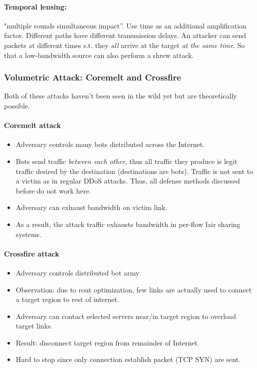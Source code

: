 \paragraph{Temporal lensing:} "multiple rounds simultaneous impact”. Use time as an additional amplification factor. Different paths have different transmission delays. An attacker can send packets at different times s.t. they \textit{all} arrive at the target \textit{at the same time}. So that a low-bandwidth source can also perform a shrew attack.

\subsubsection{Volumetric Attack: Coremelt and Crossfire}

Both of these attacks haven't been seen in the wild yet but are theoretically possible.

\paragraph{Coremelt attack}

\begin{itemize}
    \item Adversary controls many bots distributed across the Internet.
    \item Bots send traffic \textit{between each other}, thus all traffic they produce is legit traffic desired by the destination (destinations are bots). Traffic is not sent to a victim as in regular DDoS attacks. Thus, all defense methods discussed before do not work here.
    \item Adversary can exhaust bandwidth on victim link.
    \item As a result, the attack traffic exhausts bandwidth in per-flow fair sharing systems.
\end{itemize}

\paragraph{Crossfire attack}

\begin{itemize}
    \item Adversary controls distributed bot army
    \item Observation: due to rout optimization, few links are actually used to connect a target region to rest of internet. 
    \item Adversary can contact selected servers near/in target region to overload target links.
    \item Result: disconnect target region from remainder of Internet.
    \item Hard to stop since only connection establish packet (TCP SYN) are sent.
\end{itemize}

